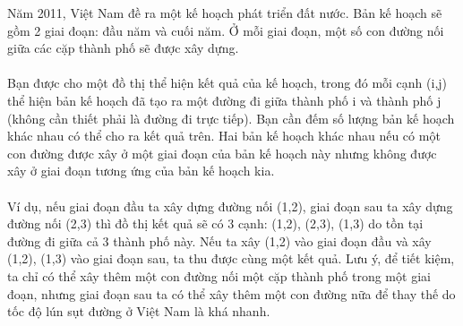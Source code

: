 Năm 2011, Việt Nam đề ra một kế hoạch phát triển đất nước. Bản kế hoạch sẽ gồm 2 giai đoạn: đầu năm và cuối năm. Ở mỗi giai đoạn, một số con đường nối giữa các cặp thành phố sẽ được xây dựng.   
\\
\\   Bạn được cho một đồ thị thể hiện kết quả của kế hoạch, trong đó mỗi cạnh (i,j) thể hiện bản kế hoạch đã tạo ra một đường đi giữa thành phố i và thành phố j (không cần thiết phải là đường đi trực tiếp). Bạn cần đếm số lượng bản kế hoạch khác nhau có thể cho ra kết quả trên. Hai bản kế hoạch khác nhau nếu có một con đường được xây ở một giai đoạn của bản kế hoạch này nhưng không được xây ở giai đoạn tương ứng của bản kế hoạch kia.   
\\
\\   Ví dụ, nếu giai đoạn đầu ta xây dựng đường nối (1,2), giai đoạn sau ta xây dựng đường nối (2,3) thì đồ thị kết quả sẽ có 3 cạnh: (1,2), (2,3), (1,3) do tồn tại đường đi giữa cả 3 thành phố này. Nếu ta xây (1,2) vào giai đoạn đầu và xây (1,2), (1,3) vào giai đoạn sau, ta thu được cùng một kết quả. Lưu ý, để tiết kiệm, ta chỉ có thể xây thêm một con đường nối một cặp thành phố trong một giai đoạn, nhưng giai đoạn sau ta có thể xây thêm một con đường nữa để thay thế do tốc độ lún sụt đường ở Việt Nam là khá nhanh.